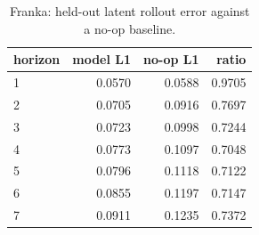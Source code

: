 \begin{table}[t]
\centering
\begin{tabular}{lrrr}
\toprule
horizon & model L1 & no-op L1 & ratio \\
\midrule
1 & 0.0570 & 0.0588 & 0.9705 \\
2 & 0.0705 & 0.0916 & 0.7697 \\
3 & 0.0723 & 0.0998 & 0.7244 \\
4 & 0.0773 & 0.1097 & 0.7048 \\
5 & 0.0796 & 0.1118 & 0.7122 \\
6 & 0.0855 & 0.1197 & 0.7147 \\
7 & 0.0911 & 0.1235 & 0.7372 \\
\bottomrule
\end{tabular}
\caption{Franka: held-out latent rollout error against a no-op baseline.}
\label{tab:franka-horizon}
\end{table}
